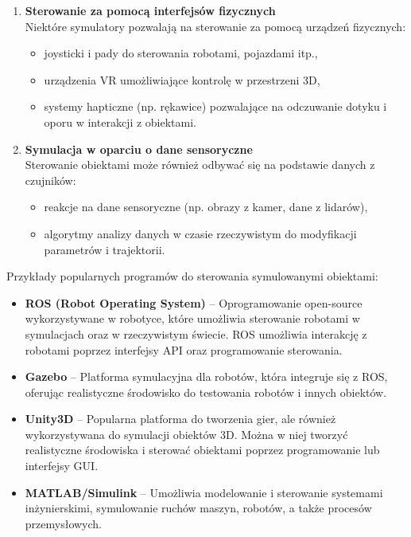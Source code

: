 \documentclass[12pt]{article}
\begin{document}
\begin{enumerate}
    \item \textbf{Sterowanie za pomocą interfejsów fizycznych} \\
    Niektóre symulatory pozwalają na sterowanie za pomocą urządzeń fizycznych:
    \begin{itemize}
        \item joysticki i pady do sterowania robotami, pojazdami itp.,
        \item urządzenia VR umożliwiające kontrolę w przestrzeni 3D,
        \item systemy hapticzne (np. rękawice) pozwalające na odczuwanie dotyku i oporu w interakcji z obiektami.
    \end{itemize}
    
    \item \textbf{Symulacja w oparciu o dane sensoryczne} \\
    Sterowanie obiektami może również odbywać się na podstawie danych z czujników:
    \begin{itemize}
        \item reakcje na dane sensoryczne (np. obrazy z kamer, dane z lidarów),
        \item algorytmy analizy danych w czasie rzeczywistym do modyfikacji parametrów i trajektorii.
    \end{itemize}
\end{enumerate}

Przykłady popularnych programów do sterowania symulowanymi obiektami:

\begin{itemize}
    \item \textbf{ROS (Robot Operating System)} – Oprogramowanie open-source wykorzystywane w robotyce, które umożliwia sterowanie robotami w symulacjach oraz w rzeczywistym świecie. ROS umożliwia interakcję z robotami poprzez interfejsy API oraz programowanie sterowania.
    
    \item \textbf{Gazebo} – Platforma symulacyjna dla robotów, która integruje się z ROS, oferując realistyczne środowisko do testowania robotów i innych obiektów.
    
    \item \textbf{Unity3D} – Popularna platforma do tworzenia gier, ale również wykorzystywana do symulacji obiektów 3D. Można w niej tworzyć realistyczne środowiska i sterować obiektami poprzez programowanie lub interfejsy GUI.
    
    \item \textbf{MATLAB/Simulink} – Umożliwia modelowanie i sterowanie systemami inżynierskimi, symulowanie ruchów maszyn, robotów, a także procesów przemysłowych.
\end{itemize}
\end{document}
